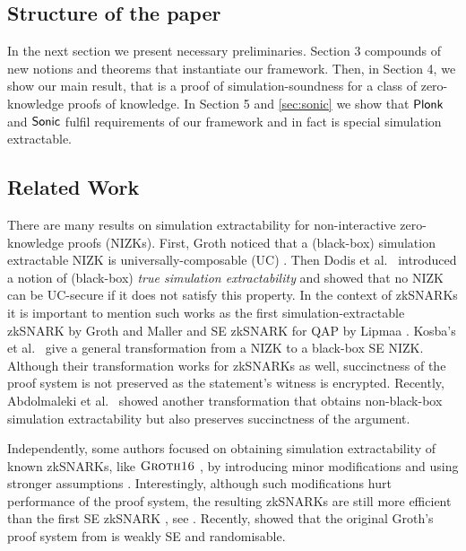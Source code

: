 \documentclass[runningheads,11pt]{llncs}
\begin{document}



\subsection{Structure of the paper}
In the next section we present necessary preliminaries. Section 3 compounds of
new notions and theorems that instantiate our framework. Then, in Section 4, we
show our main result, that is a proof of simulation-soundness for a class of
zero-knowledge proofs of knowledge. In Section 5 and \cref{sec:sonic} we show
that $\textnormal{\textsf{Plonk}}$ and ${\textnormal{\textsf{Sonic}}}$ fulfil requirements of our framework and in fact is
special simulation extractable.



\subsection{Related Work}
There are many results on simulation extractability for non-interactive
zero-knowledge proofs (NIZKs). First, Groth \cite{AC:Groth07} noticed that a
(black-box) simulation extractable NIZK is universally-composable (UC)
\cite{EPRINT:Canetti00}. Then Dodis et al.~\cite{AC:DHLW10} introduced a notion
of (black-box) \emph{true simulation extractability} and showed that no NIZK can
be UC-secure if it does not satisfy this property. In the context of zkSNARKs it is
important to mention such works as the first simulation-extractable zkSNARK by
Groth and Maller \cite{C:GroMal17} and SE zkSNARK for QAP by Lipmaa
\cite{EPRINT:Lipmaa19b}. Kosba's et al.~\cite{EPRINT:KZMQCP15} give a general
transformation from a NIZK to a black-box SE NIZK. Although their transformation
works for zkSNARKs as well, succinctness of the proof system is not preserved as
the statement's witness is encrypted. Recently, Abdolmaleki et
al.~\cite{CCS:AbdRamSla20} showed another transformation that obtains
non-black-box simulation extractability but also preserves succinctness of the
argument.

Independently, some authors focused on obtaining simulation extractability of
known zkSNARKs, like $\textsc{Groth16}$ \cite{EC:Groth16}, by introducing minor
modifications and using stronger assumptions
\cite{EPRINT:BowGab18,EPRINT:AtaBag19}. Interestingly, although such
modifications hurt performance of the proof system, the resulting zkSNARKs are
still more efficient than the first SE zkSNARK \cite{C:GroMal17}, see
\cite{EPRINT:AtaBag19}. Recently, \cite{EPRINT:BKSV20} showed that the original
Groth's proof system from \cite{EC:Groth16} is weakly SE and randomisable.
\end{document}
